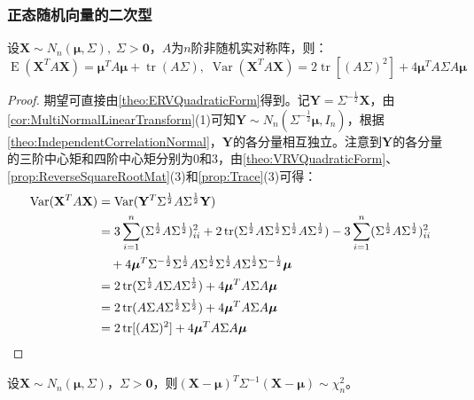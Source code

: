 \subsubsection{正态随机向量的二次型}
\begin{theorem}
	设$\mathbf{X}\sim N_n(\boldsymbol{\mu},\Sigma),\;\Sigma>\mathbf{0}$，$A$为$n$阶非随机实对称阵，则：
	\begin{equation*}
		\operatorname{E}(\mathbf{X}^TA\mathbf{X})=\boldsymbol{\mu}^TA\boldsymbol{\mu}+\operatorname{tr}(A\Sigma),\;
		\operatorname{Var}(\mathbf{X}^TA\mathbf{X})=2\operatorname{tr}[(A\Sigma)^2]+4\boldsymbol{\mu}^TA\Sigma A\boldsymbol{\mu}
	\end{equation*}
\end{theorem}
\begin{proof}
	期望可直接由\cref{theo:ERVQuadraticForm}得到。记$\mathbf{Y}=\Sigma^{-\frac{1}{2}}\mathbf{X}$，由\cref{cor:MultiNormalLinearTransform}(1)可知$\mathbf{Y}\sim N_n(\Sigma^{-\frac{1}{2}}\boldsymbol{\mu},I_n)$，根据\cref{theo:IndependentCorrelationNormal}，$\mathbf{Y}$的各分量相互独立。注意到$\mathbf{Y}$的各分量的三阶中心矩和四阶中心矩分别为$0$和$3$，由\cref{theo:VRVQuadraticForm}、\cref{prop:ReverseSquareRootMat}(3)和\cref{prop:Trace}(3)可得：
	\begin{align*}
		\operatorname{Var}(\mathbf{X}^TA\mathbf{X})
		&=\operatorname{Var}(\mathbf{Y}^T\Sigma^{\frac{1}{2}}A\Sigma^{\frac{1}{2}}\mathbf{Y}) \\
		&=3\sum_{i=1}^{n}(\Sigma^{\frac{1}{2}}A\Sigma^{\frac{1}{2}})_{ii}^2+2\operatorname{tr}(\Sigma^{\frac{1}{2}}A\Sigma^{\frac{1}{2}}\Sigma^{\frac{1}{2}}A\Sigma^{\frac{1}{2}})-3\sum_{i=1}^{n}(\Sigma^{\frac{1}{2}}A\Sigma^{\frac{1}{2}})_{ii}^2 \\
		&\quad+4\boldsymbol{\mu}^T\Sigma^{-\frac{1}{2}}\Sigma^{\frac{1}{2}}A\Sigma^{\frac{1}{2}}\Sigma^{\frac{1}{2}}A\Sigma^{\frac{1}{2}}\Sigma^{-\frac{1}{2}}\boldsymbol{\mu} \\
		&=2\operatorname{tr}(\Sigma^{\frac{1}{2}}A\Sigma A\Sigma^{\frac{1}{2}})+4\boldsymbol{\mu}^TA\Sigma A\boldsymbol{\mu} \\
		&=2\operatorname{tr}(A\Sigma A\Sigma^{\frac{1}{2}}\Sigma^{\frac{1}{2}})+4\boldsymbol{\mu}^TA\Sigma A\boldsymbol{\mu} \\
		&=2\operatorname{tr}[(A\Sigma)^2]+4\boldsymbol{\mu}^TA\Sigma A\boldsymbol{\mu}\qedhere
	\end{align*}
\end{proof}
\begin{theorem}
	设$\mathbf{X}\sim N_n(\boldsymbol{\mu},\Sigma)$，$\Sigma>\mathbf{0}$，则$(\mathbf{X}-\boldsymbol{\mu})^T\Sigma^{-1}(\mathbf{X}-\boldsymbol{\mu})\sim\chi_n^2$。
\end{theorem}
